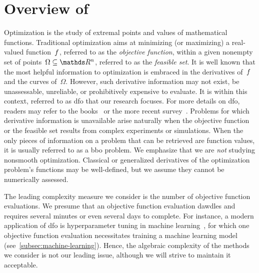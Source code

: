 \section{Overview of }

Optimization is the study of extremal points and values of mathematical functions.
Traditional optimization aims at minimizing (or maximizing) a real-valued function~$f$, referred to as the \emph{objective function}, within a given nonempty set of points~$\Omega \subseteq \R^n$, referred to as the \emph{feasible set}.
It is well known that the most helpful information to optimization is embraced in the derivatives of~$f$ and the curves of~$\Omega$.
However, such derivative information may not exist, be unassessable, unreliable, or prohibitively expensive to evaluate.
It is within this context, referred to as \gls{dfo} that our research focuses.
For more details on \gls{dfo}, readers may refer to the books~\cite{Audet_Hare_2017,Conn_Scheinberg_Vicente_2009b} or the more recent survey~\cite{Larson_Menickelly_Wild_2019}.
Problems for which derivative information is unavailable arise naturally when the objective function or the feasible set results from complex experiments or simulations.
When the only pieces of information on a problem that can be retrieved are function values, it is usually referred to as a \gls{bbo} problem.
We emphasize that we are \emph{not} studying nonsmooth optimization.
Classical or generalized derivatives of the optimization problem's functions may be well-defined, but we assume they cannot be numerically assessed.

The leading complexity measure we consider is the number of objective function evaluations.
We presume that an objective function evaluation dawdles and requires several minutes or even several days to complete.
For instance, a modern application of \gls{dfo} is hyperparameter tuning in machine learning~\cite{Ghanbari_Scheinberg_2017}, for which one objective function evaluation necessitates training a machine learning model (see~\cref{subsec:machine-learning}).
Hence, the algebraic complexity of the methods we consider is not our leading issue, although we will strive to maintain it acceptable.

